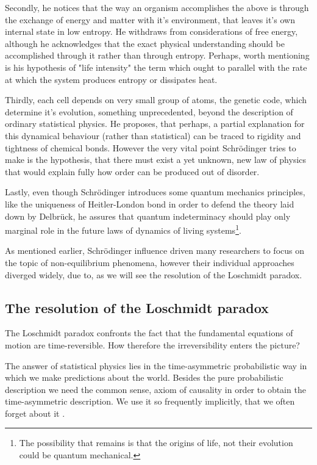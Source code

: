\documentclass[a4paper,12pt]{article}
\begin{document}
Secondly, he notices that the way an organism accomplishes the above is through the exchange of energy and matter with it's environment, that leaves it's own internal state in low entropy. He withdraws from considerations of free energy, although he acknowledges that the exact physical understanding should be accomplished through it rather than through entropy. Perhaps, worth mentioning is his hypothesis of "life intensity" the term which ought to parallel with the rate at which the system produces entropy or dissipates heat.

Thirdly, each cell depends on very small group of atoms, the genetic code, which determine it's evolution, something unprecedented, beyond the description of ordinary statistical physics. He proposes, that perhaps, a partial explanation for this dynamical behaviour (rather than statistical) can be traced to rigidity and tightness of chemical bonds. However the very vital point Schrödinger tries to make is the hypothesis, that there must exist a yet unknown, new law of physics that would explain fully how order can be produced out of disorder. 

Lastly, even though Schrödinger introduces some quantum mechanics principles, like the uniqueness of Heitler-London bond in order to defend the theory laid down by Delbrück, he assures that quantum indeterminacy should play only marginal role in the future laws of dynamics of living systems\footnote{The possibility that remains is that the origins of life, not their evolution could be quantum mechanical.}.

As mentioned earlier, Schrödinger influence driven many researchers to focus on the topic of non-equilibrium phenomena, however their individual approaches diverged widely, due to, as we will see the resolution of the Loschmidt paradox.

\subsection{The resolution of the Loschmidt paradox }

The Loschmidt paradox confronts the fact that the fundamental equations of motion are time-reversible. How therefore the irreversibility enters the picture?

The answer of statistical physics lies in the time-asymmetric probabilistic way in which we make predictions about the world. 
Besides the pure probabilistic description we need the common sense, axiom of causality in order to obtain the time-asymmetric description.
We use it so frequently implicitly, that we often forget about it \cite{Evans:2241458}. 
\end{document}
